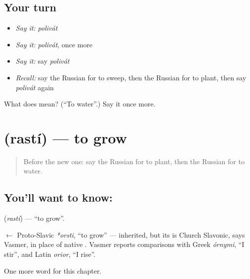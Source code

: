 \subsection*{Your turn}
\begin{itemize}
\raggedright
  \item \emph{Say it:} \emph{polivát}
  \item \emph{Say it:} \emph{polivát}, once more
  \item \emph{Say it:} say \emph{polivát}
  \item \emph{Recall:} say the Russian for to sweep, then the Russian for to plant, then say \emph{polivát} again
\end{itemize}

\begin{tcolorbox}[breakable,colback=teal!4,colframe=teal!35!black,title={Before you move on}]
What does  mean? (\textquotedblleft{}To water\textquotedblright{}.) Say it once more.
\end{tcolorbox}
\section[\texorpdfstring{\ru{расти} (rastí)}{расти (rastí)}]{ (rastí) — to grow}

\label{lesson:RU-C234-rasti}



\begin{quote}
Before the new one: say the Russian for to plant, then the Russian for to water.
\end{quote}

\subsection*{You'll want to know: }
\textbf{} (\emph{rastí}) — \textquotedblleft{}to grow\textquotedblright{}.

\begin{cousinweb}
\textbf{} $\leftarrow$ Proto-Slavic \emph{*orsti}, \textquotedblleft{}to grow\textquotedblright{} — inherited, but its \emph{} is Church Slavonic, says Vasmer, in place of native \emph{}. Vasmer reports comparisons with Greek \emph{órnymi}, \textquotedblleft{}I stir\textquotedblright{}, and Latin \emph{orior}, \textquotedblleft{}I rise\textquotedblright{}.
\end{cousinweb}

\begin{grammarlens}[title={What you've built}]
One more word for this chapter.
\end{grammarlens}

